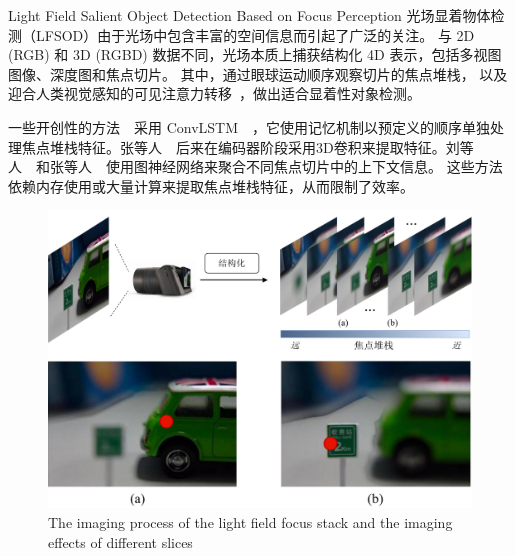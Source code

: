 %
%
%
%
%
%
%
%




{Light Field Salient Object Detection Based on Focus Perception}
\label{chap:part3}
%
%
光场显着物体检测（LFSOD）由于光场中包含丰富的空间信息而引起了广泛的关注。
与 2D (RGB) 和 3D (RGBD) 数据不同，光场本质上捕获结构化 4D 表示，包括多视图图像、深度图和焦点切片。 其中，通过眼球运动顺序观察切片的焦点堆栈，
以及迎合人类视觉感知的可见注意力转移~\cite{piao2020dut}，做出适合显着性对象检测。







一些开创性的方法~\cite{zhang2019memory,piao2020exploit}~采用 ConvLSTM~\cite{shi2015convolutional}~，它使用记忆机制以预定义的顺序单独处理焦点堆栈特征。张等人~\cite{zhang2021learning}~后来在编码器阶段采用3D卷积来提取特征。刘等人~\cite{liu2021light}~和张等人~\cite{zhang2021geometry}~使用图神经网络来聚合不同焦点切片中的上下文信息。 这些方法依赖内存使用或大量计算来提取焦点堆栈特征，从而限制了效率。




\begin{figure}[!ht]
	\centering
	\includegraphics[width=0.85\linewidth]{figures/chapter3/cpt3_idea.pdf}
	{The imaging process of the light field focus stack and the imaging effects of different slices}
	\label{figure:cpt3:idea}
\end{figure}




